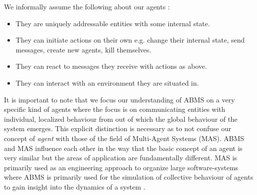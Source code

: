 We informally assume the following about our agents \cite{wooldridge_intelligent_1995}:

\begin{itemize}
	\item They are uniquely addressable entities with some internal state.
	\item They can initiate actions on their own e.g. change their internal state, send messages, create new agents, kill themselves.
	\item They can react to messages they receive with actions as above.
	\item They can interact with an environment they are situated in.
\end{itemize} 

It is important to note that we focus our understanding of ABMS on a very specific kind of agents where the focus is on communicating entities with individual, localized behaviour from out of which the global behaviour of the system emerges. This explicit distinction is necessary as to not confuse our concept of \textit{agent} with those of the field of Multi-Agent Systems (MAS). ABMS and MAS influence each other in the way that the basic concept of an agent is very similar but the areas of application are fundamentally different. MAS is primarily used as an engineering approach to organize large software-systems \cite{weiss_multiagent_2013} where ABMS is primarily used for the simulation of collective behaviour of agents to gain insight into the dynamics of a system \cite{dawson_opening_2014}.


